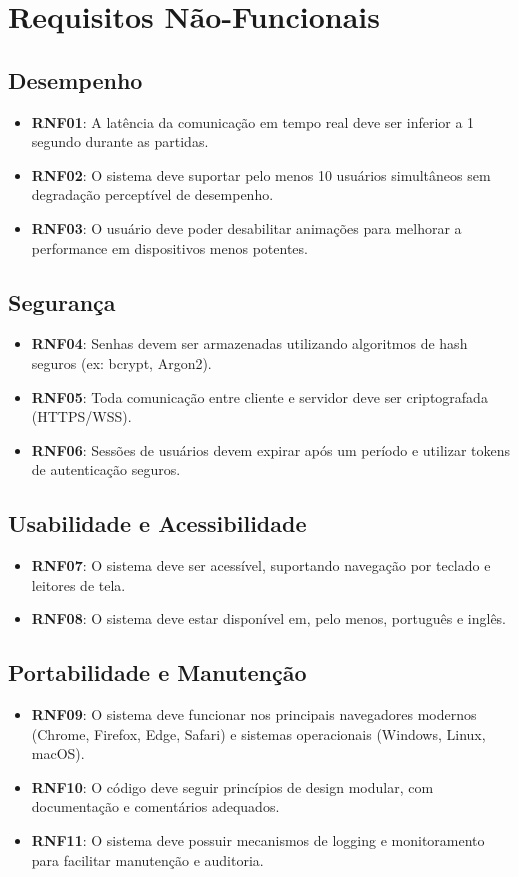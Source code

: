 \section{Requisitos Não-Funcionais}

\subsection{Desempenho}
\begin{itemize}
    \item \textbf{RNF01}: A latência da comunicação em tempo real deve ser inferior a 1 segundo durante as partidas.
    \item \textbf{RNF02}: O sistema deve suportar pelo menos 10 usuários simultâneos sem degradação perceptível de desempenho.
    \item \textbf{RNF03}: O usuário deve poder desabilitar animações para melhorar a performance em dispositivos menos potentes.
\end{itemize}

\subsection{Segurança}
\begin{itemize}
    \item \textbf{RNF04}: Senhas devem ser armazenadas utilizando algoritmos de hash seguros (ex: bcrypt, Argon2).
    \item \textbf{RNF05}: Toda comunicação entre cliente e servidor deve ser criptografada (HTTPS/WSS).
    \item \textbf{RNF06}: Sessões de usuários devem expirar após um período e utilizar tokens de autenticação seguros.
\end{itemize}

\subsection{Usabilidade e Acessibilidade}
\begin{itemize}
    \item \textbf{RNF07}: O sistema deve ser acessível, suportando navegação por teclado e leitores de tela.
    \item \textbf{RNF08}: O sistema deve estar disponível em, pelo menos, português e inglês.
\end{itemize}

\subsection{Portabilidade e Manutenção}
\begin{itemize}
    \item \textbf{RNF09}: O sistema deve funcionar nos principais navegadores modernos (Chrome, Firefox, Edge, Safari) e sistemas operacionais (Windows, Linux, macOS).
    \item \textbf{RNF10}: O código deve seguir princípios de design modular, com documentação e comentários adequados.
    \item \textbf{RNF11}: O sistema deve possuir mecanismos de logging e monitoramento para facilitar manutenção e auditoria.
\end{itemize}


